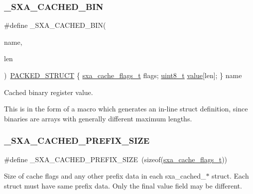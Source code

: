 \subsubsection{\texorpdfstring{\+\_\+\+S\+X\+A\+\_\+\+C\+A\+C\+H\+E\+D\+\_\+\+B\+IN}{\_SXA\_CACHED\_BIN}}
{\footnotesize\ttfamily \#define \+\_\+\+S\+X\+A\+\_\+\+C\+A\+C\+H\+E\+D\+\_\+\+B\+IN(\begin{DoxyParamCaption}\item[{}]{name,  }\item[{}]{len }\end{DoxyParamCaption})~\hyperlink{group___s_x_a_ga4233297bd31be5c273d4fb0758cc54d7}{P\+A\+C\+K\+E\+D\+\_\+\+S\+T\+R\+U\+CT} \{ \hyperlink{group___s_x_a_ga21b45e50d83fcc1363c4239313e88c06}{sxa\+\_\+cache\+\_\+flags\+\_\+t} flags; \hyperlink{group__hal__dos_gae1affc9ca37cfb624959c866a73f83c2}{uint8\+\_\+t} \hyperlink{group__zcl_ga1ed5b151a90f7e99af8cca2e6875ddf4}{value}\mbox{[}len\mbox{]}; \} name}



Cached binary register value. 

This is in the form of a macro which generates an in-\/line struct definition, since binaries are arrays with generally different maximum lengths. \mbox{\label{group___s_x_a_ga0deca0e430c1eeb8d4719574d1331900}} 
\subsubsection{\texorpdfstring{\+\_\+\+S\+X\+A\+\_\+\+C\+A\+C\+H\+E\+D\+\_\+\+P\+R\+E\+F\+I\+X\+\_\+\+S\+I\+ZE}{\_SXA\_CACHED\_PREFIX\_SIZE}}
{\footnotesize\ttfamily \#define \+\_\+\+S\+X\+A\+\_\+\+C\+A\+C\+H\+E\+D\+\_\+\+P\+R\+E\+F\+I\+X\+\_\+\+S\+I\+ZE~(sizeof(\hyperlink{group___s_x_a_ga21b45e50d83fcc1363c4239313e88c06}{sxa\+\_\+cache\+\_\+flags\+\_\+t}))}

Size of cache flags and any other prefix data in each sxa\+\_\+cached\+\_\+$\ast$ struct. Each struct must have same prefix data. Only the final \textquotesingle{}value\textquotesingle{} field may be different. \mbox{\label{group___s_x_a_ga43c6a2c7e1b5ee83edc039a248412580}} 
